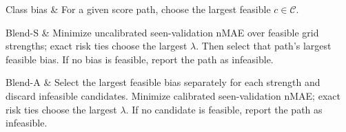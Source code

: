 Class bias &
For a given score path, choose the largest feasible $c\in\mathcal C$.\\
\addlinespace[2pt]

Blend-S &
Minimize uncalibrated seen-validation nMAE over feasible grid strengths; exact risk ties choose the largest $\lambda$.
Then select that path's largest feasible bias.
If no bias is feasible, report the path as infeasible.\\
\addlinespace[2pt]

Blend-A &
Select the largest feasible bias separately for each strength and discard infeasible candidates.
Minimize calibrated seen-validation nMAE; exact risk ties choose the largest $\lambda$.
If no candidate is feasible, report the path as infeasible.\\
\bottomrule
